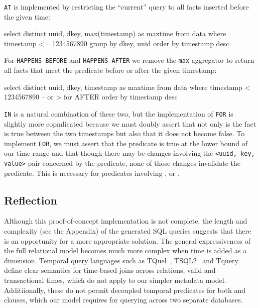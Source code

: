 \texttt{AT} is implemented by restricting the ``current'' query to all facts inserted before the given time:

\begin{sqlcode}
select distinct uuid, dkey, max(timestamp) as maxtime
from data where timestamp <= 1234567890
group by dkey, uuid order by timestamp desc
\end{sqlcode}

For \texttt{HAPPENS BEFORE} and \texttt{HAPPENS AFTER} we remove the \texttt{max} aggregator to return all facts that meet the predicate
before or after the given timestamp:

\begin{sqlcode}
select distinct uuid, dkey, timestamp as maxtime
from data
where timestamp < 1234567890 -- or > for AFTER
order by timestamp desc
\end{sqlcode}

\texttt{IN} is a natural combination of these two, but the implementation of
\texttt{FOR} is slightly more copmlicated because we must doubly assert that
not only is the fact is true between the two timestamps but also that it does not
become false. To implement \texttt{FOR}, we must assert that the predicate is
true at the lower bound of our time range and that though there may be changes
involving the \texttt{<uuid, key, value>} pair concerned by the predicate, none
of those changes invalidate the predicate. This is necessary for predicates
involving ,  or .

\subsection{Reflection}

Although this proof-of-concept implementation is not complete, the length and
complexity (see the Appendix) of the generated SQL queries suggests that there is an opportunity
for a more appropriate solution. The general expressiveness of the full
relational model becomes much more complex when time is added as a dimension.
Temporal query languages such as TQuel~\cite{snodgrass1987temporal},
TSQL2~\cite{snodgrass2012tsql2} and Tquery~\cite{kahn1991tquery} define clear
semantics for time-based joins across relations, valid and transactional times,
which do not apply to our simpler metadata model.
Additiionally, these do not permit decoupled temporal predicates for both
 and  clauses, which our model requires for
querying across two separate databases.



